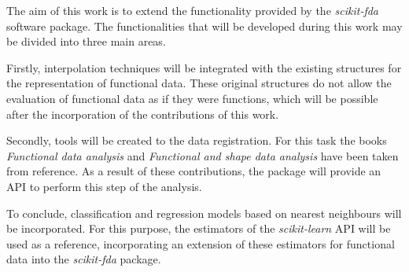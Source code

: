 

The aim of this work is to extend the functionality provided by the
\textit{scikit-fda} software package. The functionalities that will
be developed during this work may be divided into three main areas.

Firstly, interpolation techniques will be integrated with the existing
structures for the representation of functional data. These original structures
do not allow the evaluation of functional data as if they were functions,
which will be possible after the incorporation of the contributions of this work.

Secondly, tools will be created to the data registration. For this task
the books \textit{Functional data analysis}\cite{Ramsay2005} and
\textit{Functional and shape data analysis}\cite{Srivastava2016} have been taken from
reference. As a result of these contributions, the package will provide an \acs{API}
to perform this step of the analysis.

To conclude, classification and regression models based on nearest neighbours
will be incorporated. For this purpose,
the estimators of the \textit{scikit-learn}\cite{sklearn} \acs{API} will be used as a reference,
incorporating an extension of these estimators for functional data
into the \textit{scikit-fda} package.

